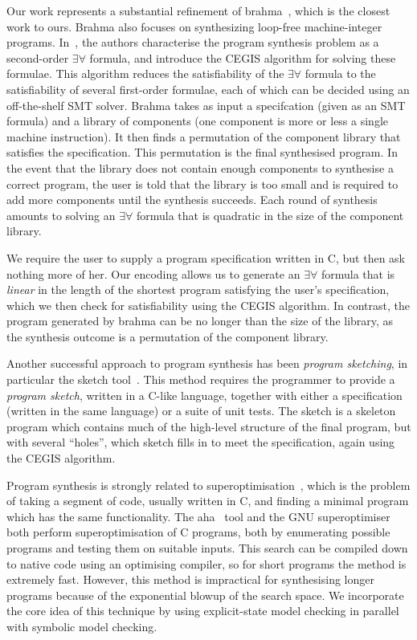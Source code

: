 \documentclass[a4paper]{llncs}
\begin{document}
Our work represents a substantial refinement of {\sc brahma}~\cite{brahma},
which is the closest work to ours.  {\sc Brahma} also focuses on
synthesizing loop-free machine-integer programs.  In~\cite{brahma}, the
authors characterise the program synthesis problem as a second-order
$\exists \forall$ formula, and introduce the CEGIS algorithm for solving
these formulae.  This algorithm reduces the satisfiability of the $\exists
\forall$ formula to the satisfiability of several first-order formulae, each
of which can be decided using an off-the-shelf SMT solver.  {\sc Brahma}
takes as input a specifcation (given as an SMT formula) and a library of
components (one component is more or less a single machine instruction).  It
then finds a permutation of the component library that satisfies the
specification.  This permutation is the final synthesised program.  In the
event that the library does not contain enough components to synthesise a
correct program, the user is told that the library is too small and is
required to add more components until the synthesis succeeds.  Each round of
synthesis amounts to solving an $\exists \forall$ formula that is quadratic
in the size of the component library.

We require the user to supply a program specification written in C, but then
ask nothing more of her.  Our encoding allows us to generate an $\exists
\forall$ formula that is \emph{linear} in the length of the shortest program
satisfying the user's specification, which we then check for satisfiability
using the CEGIS algorithm.  In contrast, the program generated by {\sc
brahma} can be no longer than the size of the library, as the synthesis
outcome is a permutation of the component library.

Another successful approach to program synthesis has been \emph{program
sketching}, in particular the {\sc sketch} tool~\cite{sketch}.  This method
requires the programmer to provide a \emph{program sketch}, written in a
C-like language, together with either a specification (written in the same
language) or a suite of unit tests.  The sketch is a skeleton program which
contains much of the high-level structure of the final program, but with
several ``holes'', which {\sc sketch} fills in to meet the specification,
again using the CEGIS algorithm.

Program synthesis is strongly related to
superoptimisation~\cite{superoptimisation}, which is the problem of taking a
segment of code, usually written in C, and finding a minimal program which
has the same functionality.  The {\sc aha}~\cite{aha} tool and the GNU
superoptimiser~\cite{gnu-superoptimiser} both perform superoptimisation of C
programs, both by enumerating possible programs and testing them on suitable
inputs.  This search can be compiled down to native code using an optimising
compiler, so for short programs the method is extremely fast.  However, this
method is impractical for synthesising longer programs because of the
exponential blowup of the search space.  We incorporate the core idea of
this technique by using explicit-state model checking in parallel with
symbolic model checking.
\end{document}
